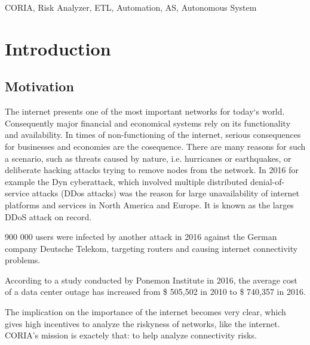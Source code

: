 \documentclass[conference]{IEEEtran}
\begin{document}
\begin{IEEEkeywords}
CORIA, Risk Analyzer, ETL, Automation, AS, Autonomous System
\end{IEEEkeywords}


\section{Introduction}
\subsection{Motivation}
The internet presents one of the most important networks for today‘s world. Consequently major financial and economical systems rely on its functionality and availability. In times of non-functioning of the internet, serious consequences for businesses and economies are the cosequence. There are many reasons for such a scenario, such as threats caused by nature, i.e. hurricanes or earthquakes, or deliberate hacking attacks trying to remove nodes from the network.  
In 2016 for example the Dyn cyberattack, which involved multiple distributed denial-of-service attacks (DDos attacks) was the reason for large unavailability of internet platforms and services in North America and Europe. It is known as the larges DDoS attack on record.

900 000 users were infected by another attack in 2016 against the German company Deutsche Telekom, targeting routers and causing internet connectivity problems. 

According to a study conducted by Ponemon Institute in 2016, the average cost of a data center outage has increased from \$ 505,502 in 2010 to \$ 740,357 in 2016.


The implication on the importance of the internet becomes very clear, which gives high incentives to analyze the riskyness of networks, like the internet. CORIA's mission is exactely that: to help analyze connectivity risks. 
\end{document}
